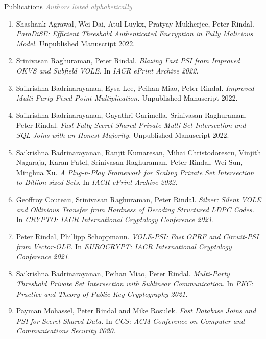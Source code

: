 \documentclass{resume} %
\begin{document}
\begin{rSection}{Publications}
\hfill {\scriptsize \textcolor{gray}{\emph{Authors listed alphabetically}}}

\begin{enumerate}[label=C\arabic* --]
	\item  Shashank Agrawal, Wei Dai, Atul Luykx, Pratyay Mukherjee, Peter Rindal. \emph{ParaDiSE: Efficient Threshold Authenticated Encryption in Fully Malicious Model.} Unpublished Manuscript 2022.
	
	
	\item Srinivasan Raghuraman, Peter Rindal. \emph{Blazing Fast PSI from Improved OKVS and Subfield VOLE.} In \emph{IACR ePrint Archive 2022.}
	
	\item 
	Saikrishna Badrinarayanan, Eysa Lee, Peihan Miao, Peter Rindal. \emph{Improved Multi-Party Fixed Point Multiplication.} Unpublished Manuscript 2022.
	
	\item Saikrishna Badrinarayanan, Gayathri Garimella, Srinivasan Raghuraman, Peter Rindal. \emph{Fast Fully Secret-Shared Private Multi-Set Intersection and SQL Joins with an Honest Majority.} Unpublished Manuscript 2022.
	
	\item 	Saikrishna Badrinarayanan, Ranjit Kumaresan, Mihai Christodorescu, Vinjith Nagaraja, Karan Patel, Srinivasan Raghuraman, Peter Rindal, Wei Sun, Minghua Xu. \emph{A Plug-n-Play Framework for Scaling Private Set Intersection to Billion-sized Sets}.  In \emph{IACR ePrint Archive 2022.}

	
	\item Geoffroy Couteau, Srinivasan Raghuraman, Peter Rindal. \emph{ Silver: Silent VOLE and Oblivious Transfer from Hardness of Decoding Structured LDPC Codes.} In \emph{CRYPTO: IACR International Cryptology Conference 2021.}
	
	
	\item Peter Rindal,  Phillipp Schoppmann. \emph{VOLE-PSI: Fast OPRF and Circuit-PSI from Vector-OLE.} In \emph{EUROCRYPT: IACR International Cryptology Conference 2021.}
	
	\item Saikrishna Badrinarayanan, Peihan Miao, Peter Rindal. \emph{Multi-Party Threshold Private Set Intersection with Sublinear Communication.} In \emph{PKC: Practice and Theory of Public-Key Cryptography 2021.}
	
	\item Payman Mohassel, Peter Rindal and Mike Rosulek. \emph{Fast Database Joins and PSI for Secret Shared Data.} In \emph{CCS: ACM Conference on Computer and Communications Security 2020.}
	

\end{enumerate}
\end{rSection}
\end{document}
